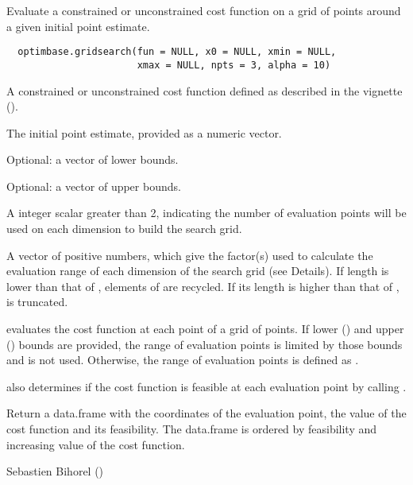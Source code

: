 %
\begin{Description}\relax
Evaluate a constrained or unconstrained cost function on a grid of points 
around a given initial point estimate.
\end{Description}
%
\begin{Usage}
\begin{verbatim}
  optimbase.gridsearch(fun = NULL, x0 = NULL, xmin = NULL, 
                       xmax = NULL, npts = 3, alpha = 10)
\end{verbatim}
\end{Usage}
%
\begin{Arguments}
\begin{ldescription}
\item[\code{fun}] A constrained or unconstrained cost function defined as described 
in the vignette ().
\item[\code{x0}] The initial point estimate, provided as a numeric vector.
\item[\code{xmin}] Optional: a vector of lower bounds.
\item[\code{xmax}] Optional: a vector of upper bounds.
\item[\code{npts}] A integer scalar greater than 2, indicating the number of 
evaluation points will be used on each dimension to build the search grid.
\item[\code{alpha}] A vector of positive numbers, which give the factor(s) used to 
calculate the evaluation range of each dimension of the search grid (see 
Details). If  length is lower than that of , elements 
of  are recycled. If its length is higher than that of 
,  is truncated.
\end{ldescription}
\end{Arguments}
%
\begin{Details}\relax
{} evaluates the cost function at each point 
of a grid of  points. If lower () and upper 
() bounds are provided, the range of evaluation points is limited 
by those bounds and  is not used. Otherwise, the range of 
evaluation points is defined as .

 also determines if the cost function is
feasible at each evaluation point by calling .
\end{Details}
%
\begin{Value}
Return a data.frame with the coordinates of the evaluation point, the value of
the cost function and its feasibility. The data.frame is ordered by 
feasibility and increasing value of the cost function.
\end{Value}
%
\begin{Author}\relax
Sebastien Bihorel ()
\end{Author}
%
\begin{SeeAlso}\relax
{}
\end{SeeAlso}
